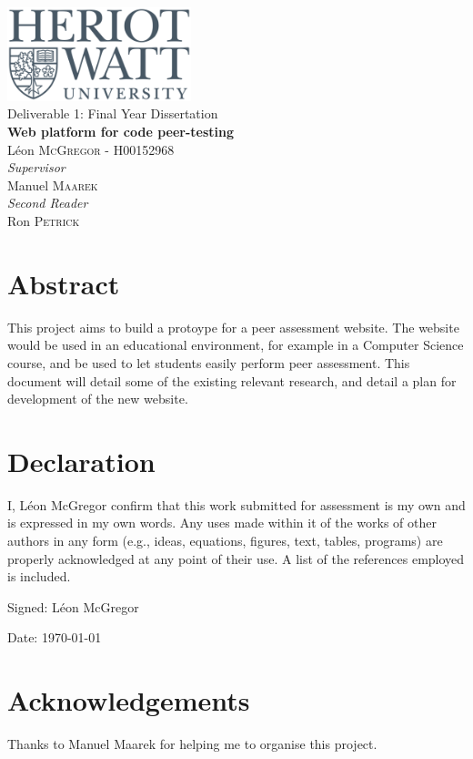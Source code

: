 \documentclass[a4paper,11pt]{report}
\newcommand{\titles}{\\\vspace{1cm}}
\begin{document}
{\centering\Large
\includegraphics[width=0.4\textwidth]{../hwu.png}\titles
Deliverable 1: Final Year Dissertation\titles
{\huge\bfseries Web platform for code peer-testing\titles}
L\'eon \textsc{McGregor} - H00152968\titles
{\large\textit{Supervisor}\\}
Manuel \textsc{Maarek}\titles
{\large\textit{Second Reader}\\}
Ron \textsc{Petrick}\\
\vfill
}

\pagebreak

\tableofcontents


\pagebreak
\doublespacing


\section*{Abstract}
This project aims to build a protoype for a peer assessment website. The website would be used in an educational environment, for example in a Computer Science course, and be used to let students easily perform peer assessment. This document will detail some of the existing relevant research, and detail a plan for development of the new website.

\vfill

\section*{Declaration}
I, L\'eon McGregor confirm that this work submitted for assessment is my own and is expressed in my own words. Any uses made within it of the works of other authors in any form (e.g., ideas, equations, figures, text, tables, programs) are properly acknowledged at any point of their use. A list of the references employed is included.\par
Signed: L\'eon McGregor\par
Date: \today

\vfill

\section*{Acknowledgements}
Thanks to Manuel Maarek for helping me to organise this project.
\end{document}

